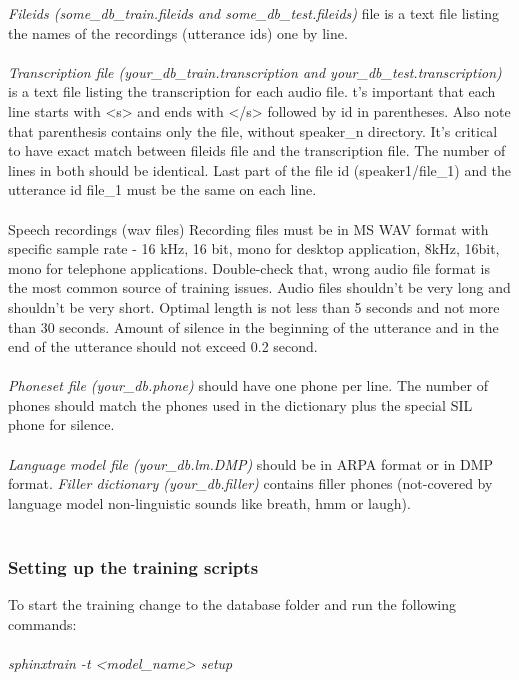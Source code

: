 \documentclass[12pt,a4paper,oldfontcommands]{memoir}
\begin{document}
\textit{Fileids (some\_db\_train.fileids and some\_db\_test.fileids)} file is a text file listing the names of the recordings (utterance ids) one by line.
\\\\
\textit{Transcription file (your\_db\_train.transcription and your\_db\_test.transcription)} is a text file listing the transcription for each audio file. t's important that each line starts with <s> and ends with </s> followed by id in parentheses. Also note that parenthesis contains only the file, without speaker\_n directory. It's critical to have exact match between fileids file and the transcription file. The number of lines in both should be identical. Last part of the file id (speaker1/file\_1) and the utterance id file\_1 must be the same on each line.\\\\
Speech recordings (wav files) Recording files must be in MS WAV format with specific sample rate - 16 kHz, 16 bit, mono for desktop application, 8kHz, 16bit, mono for telephone applications. Double-check that, wrong audio file format is the most common source of training issues. Audio files shouldn't be very long and shouldn't be very short. Optimal length is not less than 5 seconds and not more than 30 seconds. Amount of silence in the beginning of the utterance and in the end of the utterance should not exceed 0.2 second. \\\\
\textit{Phoneset file (your\_db.phone)} should have one phone per line. The number of phones should match the phones used in the dictionary plus the special SIL phone for silence.\\\\
\textit{Language model file (your\_db.lm.DMP)} should be in ARPA format or in DMP format. 
\textit{Filler dictionary (your\_db.filler)} contains filler phones (not-covered by language model non-linguistic sounds like breath, hmm or laugh).\\\\
\subsubsection{Setting up the training scripts}
To start the training change to the database folder and run the following commands:\\\\
\textit{sphinxtrain -t <model\_name> setup}\\\\
\end{document}
